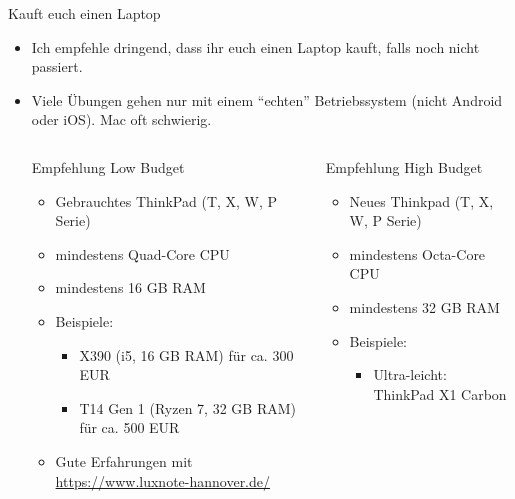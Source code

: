 \documentclass[xelatex,aspectratio=168]{beamer}
\begin{document}
\begin{frame}{Kauft euch einen Laptop}
  \begin{itemize}
    \item Ich empfehle dringend, dass ihr euch einen Laptop kauft, falls noch nicht passiert.
    \item Viele Übungen gehen nur mit einem ``echten'' Betriebssystem (nicht Android oder iOS). Mac oft schwierig.
          \begin{columns}[T]
            \begin{column}{.5\textwidth}
              \begin{block}{Empfehlung Low Budget}
                \begin{itemize}
                  \item Gebrauchtes ThinkPad (T, X, W, P Serie)
                  \item mindestens Quad-Core CPU
                  \item mindestens 16 GB RAM
                  \item Beispiele: %
                        \begin{itemize}
                          \item X390 (i5, 16 GB RAM) für ca. 300 EUR
                          \item T14 Gen 1 (Ryzen 7, 32 GB RAM) für ca. 500 EUR
                        \end{itemize}
                  \item Gute Erfahrungen mit \url{https://www.luxnote-hannover.de/}
                \end{itemize}
              \end{block}
            \end{column}
            \begin{column}{.5\textwidth}
              \begin{block}{Empfehlung High Budget}
                \begin{itemize}
                  \item Neues Thinkpad (T, X, W, P Serie)
                  \item mindestens Octa-Core CPU
                  \item mindestens 32 GB RAM
                  \item Beispiele: %
                        \begin{itemize}
                          \item Ultra-leicht: ThinkPad X1 Carbon %

\end{itemize}
\end{itemize}
\end{block}
\end{column}
\end{columns}
\end{itemize}
\end{frame}
\end{document}
